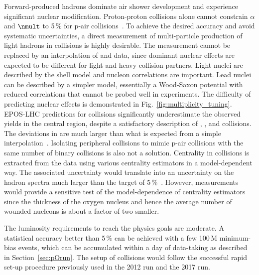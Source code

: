 \documentclass[../report.tex]{subfiles}
\begin{document}
Forward-produced hadrons dominate air shower development and experience significant nuclear modification\cite{Aaij:2017cqq,Acharya:2018qsh,Adriani:2015iwv}. Proton-proton collisions alone cannot constrain $\alpha$ and $\nmult$ to 5\,\% for p-air collisions~\cite{dEnterria:2018kcz}. To achieve the desired accuracy and avoid systematic uncertainties, a direct measurement of multi-particle production of light hadrons in \pO collisions is highly desirable. The measurement cannot be replaced by an interpolation of \pp and \pPb data, since dominant nuclear effects are expected to be different for light and heavy collision partners. Light nuclei are described by the shell model and nucleon correlations are important. Lead nuclei can be described by a simpler model, essentially a Wood-Saxon potential with reduced correlations that cannot be probed well in experiments.
The difficulty of predicting nuclear effects is demonstrated in Fig.~\ref{fig:multiplicity_tuning}. EPOS-LHC predictions for \XeXe collisions significantly underestimate the observed yields in the central region, despite a satisfactory description of \pp, \pPb, and \PbPb collisions. The deviations in \XeXe are much larger than what is expected from a simple interpolation~\cite{Kim:2018ink}. Isolating peripheral \pPb collisions to mimic p-air collisions with the same number of binary collisions is also not a solution. Centrality in \pPb collisions is extracted from the data using various centrality estimators in a model-dependent way. The associated uncertainty would translate into an uncertainty on the hadron spectra much larger than the target of 5\,\%~\cite{Toia:2014wia}. However, \pO measurements would provide a sensitive test of the model-dependence of centrality estimators since the thickness of the oxygen nucleus and hence the average number of wounded nucleons is about a factor of two smaller.

The luminosity requirements to reach the physics goals are moderate. A statistical accuracy better than 5\,\% can be achieved with a few 100\,M minimum-bias events, which can be accumulated within a day of data-taking as described in Section~\ref{sec:pOrun}. The setup of \pO collisions would follow the successful rapid set-up procedure previously used in the 2012 \pPb run and the 2017 \XeXe run.
\end{document}
